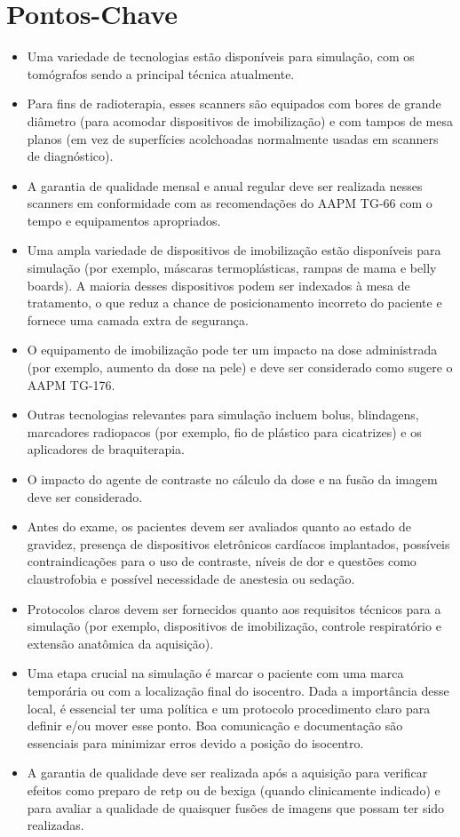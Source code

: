 \documentclass[11pt,a4paper]{article}
\newcounter{exemplo}
\begin{document}
\section{Pontos-Chave}

\begin{exemplo}
	\begin{itemize}
		\item Uma variedade de tecnologias estão disponíveis para simulação, com os tomógrafos sendo a principal técnica atualmente.
		\item  Para fins de radioterapia, esses scanners são equipados com bores de grande diâmetro (para acomodar dispositivos de imobilização) e com tampos de mesa planos (em vez de superfícies acolchoadas normalmente usadas em scanners de diagnóstico). 
		\item A garantia de qualidade mensal e anual regular deve ser realizada nesses scanners em conformidade com as recomendações do AAPM TG-66 com o tempo e equipamentos apropriados.
		\item  Uma ampla variedade de dispositivos de imobilização estão disponíveis para simulação (por exemplo, máscaras termoplásticas, rampas de mama e belly boards). A maioria desses dispositivos podem ser indexados à mesa de tratamento, o que reduz a chance de posicionamento incorreto do paciente e fornece uma camada extra de segurança.
		\item O equipamento de imobilização pode ter um impacto na dose administrada (por exemplo, aumento da dose na pele) e deve ser considerado como sugere o AAPM TG-176.
		\item Outras tecnologias relevantes para simulação incluem bolus, blindagens, marcadores radiopacos (por exemplo, fio de plástico para cicatrizes) e os aplicadores de braquiterapia.
		\item O impacto do agente de contraste no cálculo da dose e na fusão da imagem deve ser considerado.
		\item Antes do exame, os pacientes devem ser avaliados quanto ao estado de gravidez, presença de dispositivos eletrônicos cardíacos implantados, possíveis contraindicações para o uso de contraste, níveis de dor e questões como claustrofobia e possível necessidade de anestesia ou sedação.
		\item Protocolos claros devem ser fornecidos quanto aos requisitos técnicos para a simulação (por exemplo, dispositivos de imobilização, controle respiratório e extensão anatômica da aquisição).
		\item Uma etapa crucial na simulação é marcar o paciente com uma marca temporária ou com a localização final do isocentro. Dada a importância desse local, é essencial ter uma política e um protocolo procedimento claro para definir e/ou mover esse ponto. Boa comunicação e documentação são essenciais para minimizar erros devido a posição do isocentro. 
		\item A garantia de qualidade deve ser realizada após a aquisição para verificar efeitos como preparo de retp ou de bexiga (quando clinicamente indicado) e para avaliar a qualidade de quaisquer fusões de imagens que possam ter sido realizadas.

	\end{itemize}
\end{exemplo}


\end{document}
